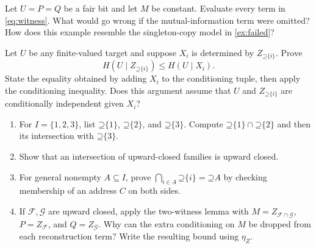 \documentclass[11pt]{article}
\newcommand{\Up}{\mathord{\supseteq}}
\begin{document}
\begin{exercise}
\label{ex:dependence}\important
Let $U=P=Q$ be a fair bit and let $M$ be constant. Evaluate every term in
\eqref{eq:witness}. What would go wrong if the mutual-information term were
omitted? How does this example resemble the singleton-copy model in \cref{ex:failed}?
\end{exercise}

\begin{exercise}
\label{ex:transfer}\important
Let $U$ be any finite-valued target and suppose $X_i$ is determined by
$Z_{\Up\{i\}}$. Prove
\[
 H(U\mid Z_{\Up\{i\}})\le H(U\mid X_i).
\]
State the equality obtained by adding $X_i$ to the conditioning tuple, then
apply the conditioning inequality. Does this argument assume that $U$ and
$Z_{\Up\{i\}}$ are conditionally independent given $X_i$?
\end{exercise}

\begin{exercise}
\label{ex:intersections}\important
\begin{enumerate}
\item For $I=\{1,2,3\}$, list $\Up\{1\}$, $\Up\{2\}$, and
$\Up\{3\}$. Compute $\Up\{1\}\cap\Up\{2\}$ and then its
intersection with $\Up\{3\}$.
\item Show that an intersection of upward-closed families is upward closed.
\item For general nonempty $A\subseteq I$, prove
$\bigcap_{i\in A}\Up\{i\}=\Up A$ by checking membership of an address
$C$ on both sides.
\item If $\mathcal{F},\mathcal{G}$ are upward closed, apply the two-witness
lemma with $M=Z_{\mathcal{F}\cap\mathcal{G}}$,
$P=Z_{\mathcal{F}}$, and $Q=Z_{\mathcal{G}}$.
Why can the extra conditioning on $M$ be dropped from each reconstruction
term? Write the resulting bound using $\eta_Z$.
\end{enumerate}
\end{exercise}
\end{document}
